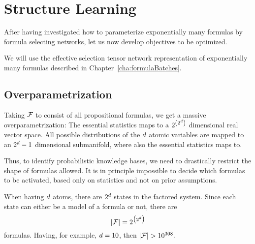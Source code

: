 \section{Structure Learning}


After having investigated how to parameterize exponentially many formulas by formula selecting networks, let us now develop objectives to be optimized.


We will use the effective selection tensor network representation of exponentially many formulas described in Chapter~\ref{cha:formulaBatches}.




\subsection{Overparametrization}


Taking $\mathcal{F}$ to consist of all propositional formulas, we get a massive overparametrization: 
The essential statistics maps to a $2^{\left(2^d \right)}$ dimensional real vector space.
All possible distributions of the $d$ atomic variables are mapped to an $2^d-1$ dimensional submanifold, where also the essential statistics maps to.

Thus, to identify probabilistic knowledge bases, we need to drastically restrict the shape of formulas allowed.
It is in principle impossible to decide which formulas to be activated, based only on statistics and not on prior assumptions.

When having $d$ atoms, there are $2^{d}$ states in the factored system.
Since each state can either be a model of a formula or not, there are
	\[ \left|\mathcal{F}\right| = 2^{\big(2^d \big)} \]
formulas.
Having, for example, $d=10$, then $\cardof{\formulaset}>10^{308}$.


